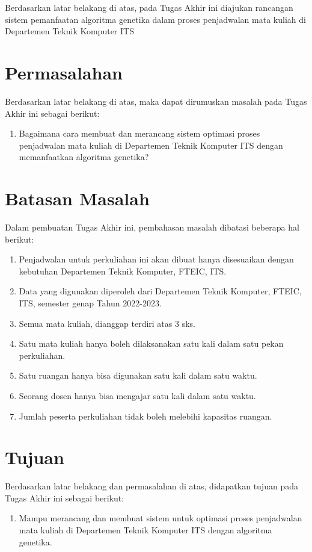 Berdasarkan latar belakang di atas, pada Tugas Akhir ini diajukan rancangan sistem pemanfaatan algoritma genetika dalam proses penjadwalan mata kuliah di Departemen Teknik Komputer ITS
\section{Permasalahan}
\label{sec:permasalahan}

Berdasarkan latar belakang di atas, maka dapat dirumuskan masalah pada Tugas Akhir ini sebagai berikut:
\begin{enumerate}
    \item Bagaimana cara membuat dan merancang sistem optimasi proses penjadwalan mata kuliah di Departemen Teknik Komputer ITS dengan memanfaatkan algoritma genetika?
\end{enumerate}
\section{Batasan Masalah}
\label{sec:batasanmasalah}

Dalam pembuatan Tugas Akhir ini, pembahasan masalah dibatasi beberapa hal berikut:
\begin{enumerate}[nolistsep]
    \item Penjadwalan untuk perkuliahan ini akan dibuat hanya disesuaikan dengan kebutuhan Departemen Teknik Komputer, FTEIC, ITS.
    \item Data yang digunakan diperoleh dari Departemen Teknik Komputer, FTEIC, ITS, semester genap Tahun 2022-2023.
    \item Semua mata kuliah, dianggap terdiri atas 3 sks.
    \item Satu mata kuliah hanya boleh dilaksanakan satu kali dalam satu pekan perkuliahan.
    \item Satu ruangan hanya bisa digunakan satu kali dalam satu waktu.
    \item Seorang dosen hanya bisa mengajar satu kali dalam satu waktu.
    \item Jumlah peserta perkuliahan tidak boleh melebihi kapasitas ruangan.
\end{enumerate}

\section{Tujuan}
\label{sec:Tujuan}

Berdasarkan latar belakang dan permasalahan di atas, didapatkan tujuan pada Tugas Akhir ini sebagai berikut:
\begin{enumerate}
    \item Mampu merancang dan membuat sistem untuk optimasi proses penjadwalan mata kuliah di Departemen Teknik Komputer ITS dengan algoritma genetika.
\end{enumerate}

